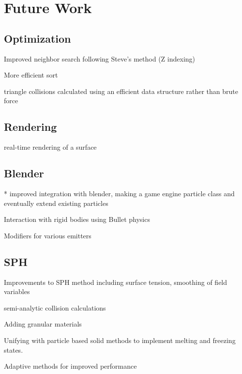 \chapter{Future Work}

\section{Optimization}
Improved neighbor search following Steve's method (Z indexing)


More efficient sort


triangle collisions calculated using an efficient data structure rather than brute force


\section{Rendering}
real-time rendering of a surface


\section{Blender}
* improved integration with blender, making a game engine particle class and
eventually extend existing particles


Interaction with rigid bodies using Bullet physics


Modifiers for various emitters


\section{SPH}
Improvements to SPH method including surface tension, smoothing of field variables


semi-analytic collision calculations \cite{Manenti2011} \cite{Harada2007}

Adding granular materials


Unifying with particle based solid methods to implement melting and freezing states.


Adaptive methods for improved performance



